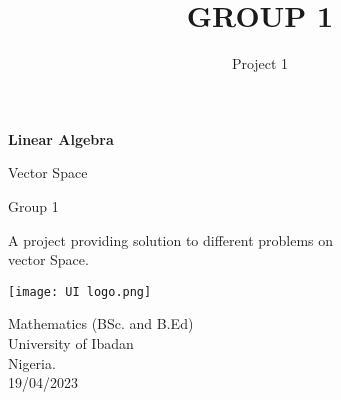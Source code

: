 \documentclass[45pt]{article}
\title{GROUP 1}
\author{Project 1}
\begin{document}
\begin{titlepage}
    \begin{center}
        \vspace*{1cm}
        \Huge
        \textbf{Linear Algebra}
        
        \vspace{0.5cm}
        \LARGE
        Vector Space
        
        \vspace{0.5cm}
        {\fontsize{70}{70}\selectfont Group 1}
        \vspace{0.6cm}        
            
        A project providing solution to  different problems on \\vector Space.
        \vspace{0.8cm}
            
        \texttt{[image: UI logo.png]}

        \vspace{1.0cm}
        
        \Large{
         Mathematics (BSc. and B.Ed)\\
        University of Ibadan\\
        Nigeria.\\
        19/04/2023}
            
    \end{center}
\end{titlepage}
\Huge{} 
\\\\
\Large{}
\end{document}
